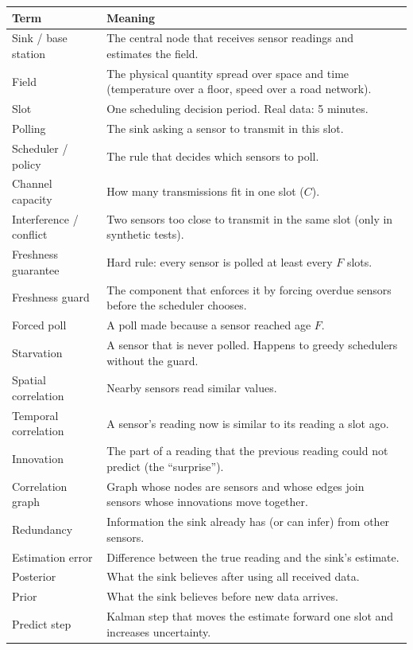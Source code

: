 {\small
\begin{longtable}{@{}p{3.6cm}p{11.8cm}@{}}
\toprule
\textbf{Term} & \textbf{Meaning} \\
\midrule
\endhead
Sink / base station & The central node that receives sensor readings and estimates the field. \\
Field & The physical quantity spread over space and time (temperature over a floor, speed over a road network). \\
Slot & One scheduling decision period. Real data: 5 minutes. \\
Polling & The sink asking a sensor to transmit in this slot. \\
Scheduler / policy & The rule that decides which sensors to poll. \\
Channel capacity & How many transmissions fit in one slot ($C$). \\
Interference / conflict & Two sensors too close to transmit in the same slot (only in synthetic tests). \\
Freshness guarantee & Hard rule: every sensor is polled at least every $F$ slots. \\
Freshness guard & The component that enforces it by forcing overdue sensors before the scheduler chooses. \\
Forced poll & A poll made because a sensor reached age $F$. \\
Starvation & A sensor that is never polled. Happens to greedy schedulers without the guard. \\
Spatial correlation & Nearby sensors read similar values. \\
Temporal correlation & A sensor's reading now is similar to its reading a slot ago. \\
Innovation & The part of a reading that the previous reading could not predict (the ``surprise''). \\
Correlation graph & Graph whose nodes are sensors and whose edges join sensors whose innovations move together. \\
Redundancy & Information the sink already has (or can infer) from other sensors. \\
Estimation error & Difference between the true reading and the sink's estimate. \\
Posterior & What the sink believes after using all received data. \\
Prior & What the sink believes before new data arrives. \\
Predict step & Kalman step that moves the estimate forward one slot and increases uncertainty. \\

\end{longtable}}
